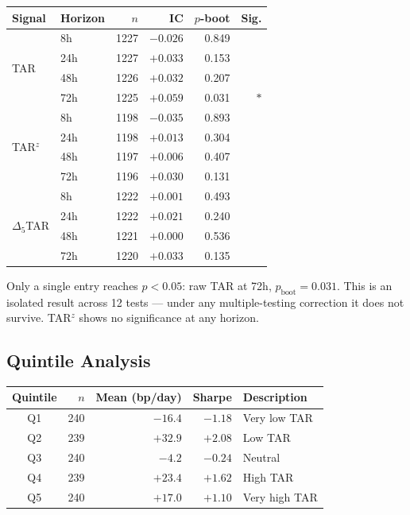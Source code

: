 \documentclass[12pt, a4paper]{article}
\theoremstyle{plain}
\theoremstyle{definition}
\begin{document}
\begin{center}
\begin{tabular}{llrrrr}
\toprule
Signal & Horizon & $n$ & IC & $p$-boot & Sig. \\
\midrule
\multirow{4}{*}{TAR}
  & 8h  & 1227 & $-0.026$ & 0.849 & \\
  & 24h & 1227 & $+0.033$ & 0.153 & \\
  & 48h & 1226 & $+0.032$ & 0.207 & \\
  & 72h & 1225 & $+0.059$ & 0.031 & $*$ \\
\midrule
\multirow{4}{*}{TAR$^z$}
  & 8h  & 1198 & $-0.035$ & 0.893 & \\
  & 24h & 1198 & $+0.013$ & 0.304 & \\
  & 48h & 1197 & $+0.006$ & 0.407 & \\
  & 72h & 1196 & $+0.030$ & 0.131 & \\
\midrule
\multirow{4}{*}{$\Delta_5$TAR}
  & 8h  & 1222 & $+0.001$ & 0.493 & \\
  & 24h & 1222 & $+0.021$ & 0.240 & \\
  & 48h & 1221 & $+0.000$ & 0.536 & \\
  & 72h & 1220 & $+0.033$ & 0.135 & \\
\bottomrule
\end{tabular}
\end{center}

Only a single entry reaches $p < 0.05$: raw TAR at 72h, $p_{\mathrm{boot}}
= 0.031$.  This is an isolated result across 12 tests --- under any
multiple-testing correction it does not survive.  TAR$^z$ shows no
significance at any horizon.

\subsection{Quintile Analysis}

\begin{center}
\begin{tabular}{crrrl}
\toprule
Quintile & $n$ & Mean (bp/day) & Sharpe & Description \\
\midrule
Q1 & 240 & $-16.4$ & $-1.18$ & Very low TAR \\
Q2 & 239 & $+32.9$ & $+2.08$ & Low TAR \\
Q3 & 240 & $-4.2$  & $-0.24$ & Neutral \\
Q4 & 239 & $+23.4$ & $+1.62$ & High TAR \\
Q5 & 240 & $+17.0$ & $+1.10$ & Very high TAR \\
\bottomrule
\end{tabular}
\end{center}
\end{document}
